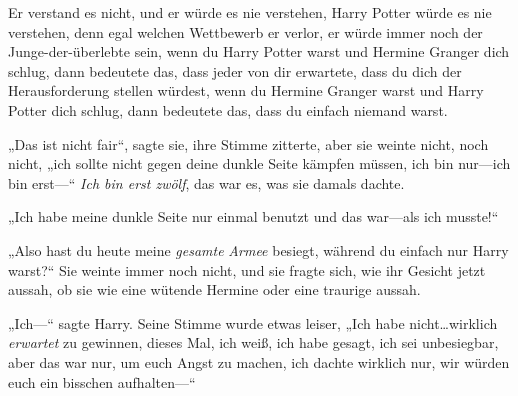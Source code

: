 Er verstand es nicht, und er würde es nie verstehen, Harry Potter würde es nie verstehen, denn egal welchen Wettbewerb er verlor, er würde immer noch der Junge-der-überlebte sein, wenn du Harry Potter warst und Hermine Granger dich schlug, dann bedeutete das, dass jeder von dir erwartete, dass du dich der Herausforderung stellen würdest, wenn du Hermine Granger warst und Harry Potter dich schlug, dann bedeutete das, dass du einfach niemand warst.

„Das ist nicht fair“, sagte sie, ihre Stimme zitterte, aber sie weinte nicht, noch nicht, „ich sollte nicht gegen deine dunkle Seite kämpfen müssen, ich bin nur—ich bin erst—“ \emph{Ich bin erst zwölf}, das war es, was sie damals dachte.%

„Ich habe meine dunkle Seite nur einmal benutzt und das war—als ich musste!“

„Also hast du heute meine \emph{gesamte} \emph{Armee} besiegt, während du einfach nur Harry warst?“ Sie weinte immer noch nicht, und sie fragte sich, wie ihr Gesicht jetzt aussah, ob sie wie eine wütende Hermine oder eine traurige aussah.

„Ich—“ sagte Harry. Seine Stimme wurde etwas leiser, „Ich habe nicht…wirklich \emph{erwartet} zu gewinnen, dieses Mal, ich weiß, ich habe gesagt, ich sei unbesiegbar, aber das war nur, um euch Angst zu machen, ich dachte wirklich nur, wir würden euch ein bisschen aufhalten—“

